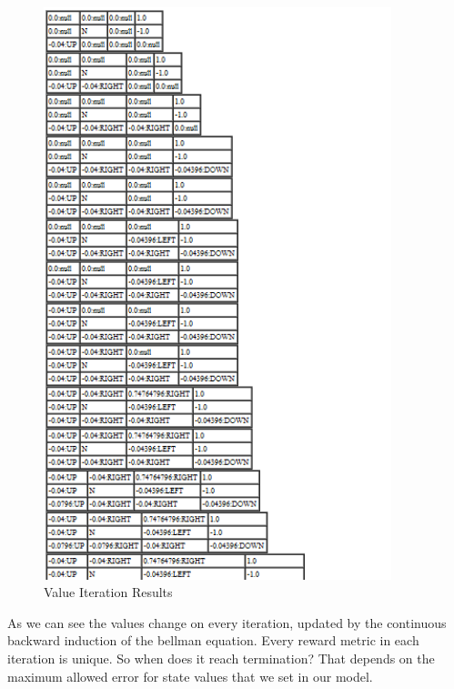 \begin{figure}[h!]
    \label{fig:ValueIterationResults}
    \begin{center}
        \includegraphics[width=0.90\textwidth]{Figures/Planning_Figure_2.png}
        \caption{Value Iteration Results}
    \end{center}
\end{figure}

As we can see the values change on every iteration, updated by the continuous
backward induction of the bellman equation. Every reward metric in
each iteration is unique. So when does it reach termination? That depends on the
maximum allowed error for state values that we set in our model. 

